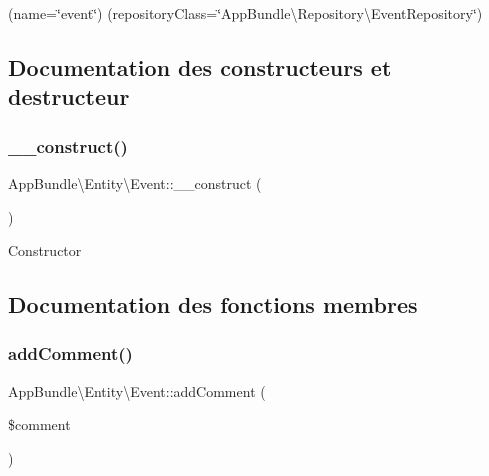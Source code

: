 (name=\char`\"{}event\char`\"{}) (repository\+Class=\char`\"{}\+App\+Bundle\textbackslash{}\+Repository\textbackslash{}\+Event\+Repository\char`\"{}) 

\subsection{Documentation des constructeurs et destructeur}
\mbox{\label{classAppBundle_1_1Entity_1_1Event_ad738c33b2824cc1130b06c5bc7ace4d9}} 
\subsubsection{\texorpdfstring{\+\_\+\+\_\+construct()}{\_\_construct()}}
{\footnotesize\ttfamily App\+Bundle\textbackslash{}\+Entity\textbackslash{}\+Event\+::\+\_\+\+\_\+construct (\begin{DoxyParamCaption}{ }\end{DoxyParamCaption})}

Constructor 

\subsection{Documentation des fonctions membres}
\mbox{\label{classAppBundle_1_1Entity_1_1Event_aaa67dc26030fe5c273575c5c093aeb4b}} 
\subsubsection{\texorpdfstring{add\+Comment()}{addComment()}}
{\footnotesize\ttfamily App\+Bundle\textbackslash{}\+Entity\textbackslash{}\+Event\+::add\+Comment (\begin{DoxyParamCaption}\item[{\textbackslash{}\hyperlink{classAppBundle_1_1Entity_1_1EventComment}{App\+Bundle\textbackslash{}\+Entity\textbackslash{}\+Event\+Comment}}]{\$comment }\end{DoxyParamCaption})}

